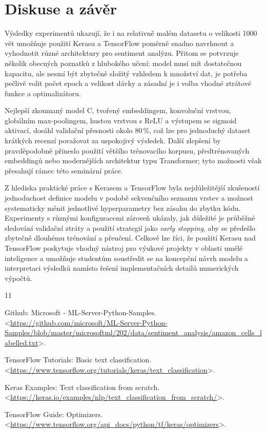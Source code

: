 \documentclass[a4paper,oneside,11pt,usenames,dvipsnames]{article}
\begin{document}
\section{Diskuse a závěr}
Výsledky experimentů ukazují, že i na relativně malém datasetu o velikosti 1000 vět umožňuje použití Kerasu a TensorFlow poměrně snadno navrhnout a vyhodnotit různé architektury pro sentiment analýzu. Přitom se potvrzuje několik obecných poznatků z hlubokého učení: model musí mít dostatečnou kapacitu, ale nesmí být zbytečně složitý vzhledem k množství dat, je potřeba pečlivě volit počet epoch a velikost dávky a zásadní je i volba vhodné ztrátové funkce a optimalizátoru.

Nejlepší zkoumaný model C, tvořený embeddingem, konvoluční vrstvou, globálním max-poolingem, hustou vrstvou s ReLU a výstupem se sigmoid aktivací, dosáhl validační přesnosti okolo 80\,\%, což lze pro jednoduchý dataset krátkých recenzí považovat za uspokojivý výsledek. Další zlepšení by pravděpodobně přineslo použití většího trénovacího korpusu, předtrénovaných embeddingů nebo modernějších architektur typu Transformer; tyto možnosti však přesahují rámec této seminární práce.

Z hlediska praktické práce s Kerasem a TensorFlow byla nejdůležitější zkušeností jednoduchost definice modelu v podobě sekvenčního seznamu vrstev a možnost systematicky měnit jednotlivé hyperparametry bez zásahu do zbytku kódu. Experimenty s různými konfiguracemi zároveň ukázaly, jak důležité je průběžné sledování validační ztráty a použití strategií jako \emph{early stopping}, aby se předešlo zbytečně dlouhému trénování a přeučení. Celkově lze říci, že použití Kerasu nad TensorFlow poskytuje vhodný nástroj pro výukové projekty v oblasti umělé inteligence a umožňuje studentům soustředit se na koncepční návrh modelu a interpretaci výsledků namísto řešení implementačních detailů numerických výpočtů.

\begin{thebibliography}{11}
\setlength{\parskip}{0ex}

	Github: Microsoft - ML-Server-Python-Samples. \textless\url{https://github.com/microsoft/ML-Server-Python-Samples/blob/master/microsoftml/202/data/sentiment_analysis/amazon_cells_labelled.txt}\textgreater.

	TensorFlow Tutorials: Basic text classification. \textless\url{https://www.tensorflow.org/tutorials/keras/text_classification}\textgreater.

	Keras Examples: Text classification from scratch. \textless\url{https://keras.io/examples/nlp/text_classification_from_scratch/}\textgreater.

	TensorFlow Guide: Optimizers. \textless\url{https://www.tensorflow.org/api_docs/python/tf/keras/optimizers}\textgreater.

\end{thebibliography}
\end{document}
